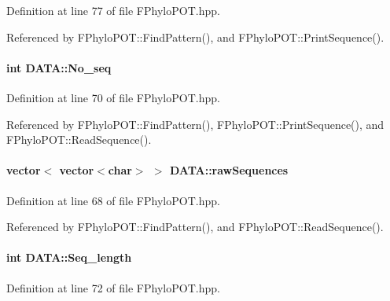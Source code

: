 \-Definition at line 77 of file \-F\-Phylo\-P\-O\-T.\-hpp.



\-Referenced by \-F\-Phylo\-P\-O\-T\-::\-Find\-Pattern(), and \-F\-Phylo\-P\-O\-T\-::\-Print\-Sequence().

\hypertarget{structDATA_a988fb40b7296abe1c35d07aba414922d}{
\paragraph[{\-No\-\_\-seq}]{\setlength{\rightskip}{0pt plus 5cm}int {\bf \-D\-A\-T\-A\-::\-No\-\_\-seq}}}\label{structDATA_a988fb40b7296abe1c35d07aba414922d}


\-Definition at line 70 of file \-F\-Phylo\-P\-O\-T.\-hpp.



\-Referenced by \-F\-Phylo\-P\-O\-T\-::\-Find\-Pattern(), \-F\-Phylo\-P\-O\-T\-::\-Print\-Sequence(), and \-F\-Phylo\-P\-O\-T\-::\-Read\-Sequence().

\hypertarget{structDATA_aa02f132fe5b0ecd2f64374da002efbec}{
\paragraph[{raw\-Sequences}]{\setlength{\rightskip}{0pt plus 5cm}vector$<$ vector$<$char$>$ $>$ {\bf \-D\-A\-T\-A\-::raw\-Sequences}}}\label{structDATA_aa02f132fe5b0ecd2f64374da002efbec}


\-Definition at line 68 of file \-F\-Phylo\-P\-O\-T.\-hpp.



\-Referenced by \-F\-Phylo\-P\-O\-T\-::\-Find\-Pattern(), and \-F\-Phylo\-P\-O\-T\-::\-Read\-Sequence().

\hypertarget{structDATA_ad43ceda299bda19eae5a7b5f1f17ce06}{
\paragraph[{\-Seq\-\_\-length}]{\setlength{\rightskip}{0pt plus 5cm}int {\bf \-D\-A\-T\-A\-::\-Seq\-\_\-length}}}\label{structDATA_ad43ceda299bda19eae5a7b5f1f17ce06}


\-Definition at line 72 of file \-F\-Phylo\-P\-O\-T.\-hpp.



